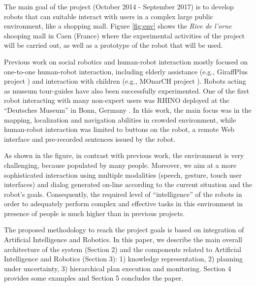 The main goal of the \coaches project (October 2014 - September 2017)  is to develop robots that can suitable interact with users in a complex large public environment, like a shopping mall.
Figure \ref{fig:env} shows the \emph{Rive de l'orne} shooping mall in Caen (France) where the experimental activities of the project will be carried out, as well as a prototype of the robot that will be used.


Previous work on social robotics and human-robot interaction mostly focused on one-to-one human-robot interaction, including elderly assistance (e.g., GiraffPlus project \cite{CoCe14}) and interaction with children (e.g., MOnarCH project \cite{FeSe14}). Robots acting as museum tour-guides have also been successfully experimented. One of the first robot interacting with many non-expert users was RHINO deployed at the ``Deutsches Museum'' in Bonn,
Germany \cite{BuCr98}. In this work, the main focus was in the mapping, localization and navigation abilities in crowded environment, while human-robot interaction was limited to buttons on the robot, a remote Web interface and pre-recorded sentences issued by the robot.

As shown in the figure, in contrast with previous work, the \coaches environment is very challenging, because populated by many people.
Moreover, we aim at a more sophisticated interaction using multiple modalities (speech, gesture, touch user interfaces) and dialog generated on-line according to the current situation
and the robot's goals.
Consequently, the required level of ``intelligence'' of the \coaches robots in order to adequately perform complex and effective tasks in this environment in presence of people is much higher than in previous projects.

The proposed methodology to reach the project goals is based on integration of Artificial Intelligence and Robotics.
In this paper, we describe the main overall architecture of the system (Section 2) and the components related to Artificial Intelligence and Robotics (Section 3): 1) knowledge representation, 2) planning under uncertainty, 3) hierarchical plan execution and monitoring. 
Section 4 provides some examples and Section 5 concludes the paper.



